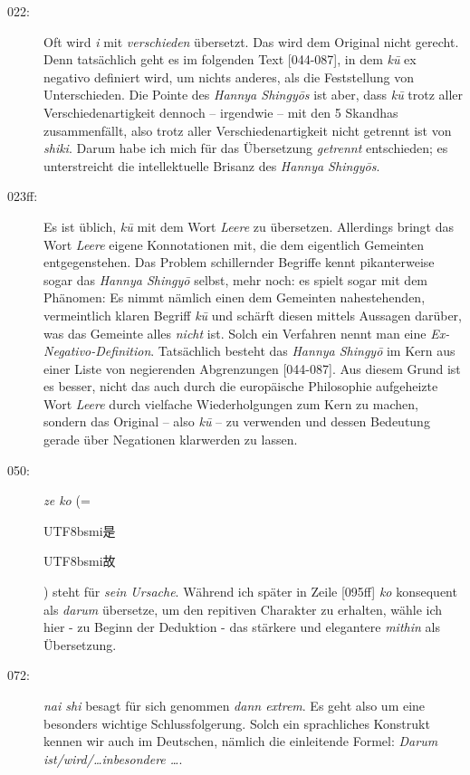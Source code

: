 \documentclass[
DIV=calc,
BCOR=5mm,
11pt,
headings=small,
oneside,
bibtotocnumbered]{scrartcl}
\newcommand{\cnbsmi}[1]{\begin{CJK}{UTF8}{bsmi}#1\end{CJK}}
\begin{document}
\begin{description}
  \item[022:] Oft wird \emph{i} mit \emph{verschieden} übersetzt. Das wird dem
  Original nicht gerecht. Denn tatsächlich geht es im folgenden Text [044-087],
  in dem \emph{kū} ex negativo definiert wird, um nichts anderes, als die
  Feststellung von Unterschieden. Die Pointe des \emph{Hannya Shingyōs} ist
  aber, dass \emph{kū} trotz aller Verschiedenartigkeit dennoch -- irgendwie --
  mit den 5 Skandhas zusammenfällt, also trotz aller Verschiedenartigkeit nicht
  getrennt ist von \emph{shiki}. Darum habe ich mich für das Übersetzung
  \emph{getrennt} entschieden; es unterstreicht die intellektuelle Brisanz des
  \emph{Hannya Shingyōs}.

  \item[023ff:] Es ist üblich, \emph{kū} mit dem Wort \emph{Leere} zu
  übersetzen. Allerdings bringt das Wort \emph{Leere} eigene Konnotationen mit,
  die dem eigentlich Gemeinten entgegenstehen. Das Problem schillernder Begriffe
  kennt pikanterweise sogar das \emph{Hannya Shingyō} selbst, mehr noch: es
  spielt sogar mit dem Phänomen: Es nimmt nämlich einen dem Gemeinten
  nahestehenden, vermeintlich klaren Begriff \emph{kū} und schärft diesen
  mittels Aussagen darüber, was das Gemeinte alles \emph{nicht} ist. Solch ein
  Verfahren nennt man eine \emph{Ex-Negativo-Definition}. Tatsächlich besteht
  das \emph{Hannya Shingyō} im Kern aus einer Liste von negierenden Abgrenzungen
  [044-087]. Aus diesem Grund ist es besser, nicht das auch durch die
  europäische Philosophie aufgeheizte Wort \emph{Leere} durch vielfache
  Wiederholgungen zum Kern zu machen, sondern das Original -- also \emph{kū} -- 
  zu verwenden und dessen Bedeutung gerade über Negationen klarwerden zu lassen.

  \item[050:] \emph{ze ko} (= \cnbsmi{是} \cnbsmi{故}) steht für \emph{sein
  Ursache}. Während ich später in Zeile [095ff] \emph{ko} konsequent als
  \emph{darum} übersetze, um den repitiven Charakter zu erhalten, wähle ich hier
  - zu Beginn der Deduktion - das stärkere und elegantere \emph{mithin} als
  Übersetzung.
  \item[072:] \emph{nai shi} besagt für sich genommen \emph{dann extrem}. Es
  geht also um eine besonders wichtige Schlussfolgerung. Solch ein sprachliches
  Konstrukt kennen wir auch im Deutschen, nämlich die einleitende Formel:
  \emph{Darum ist/wird/\ldots inbesondere \ldots}.


\end{description}
\end{document}
